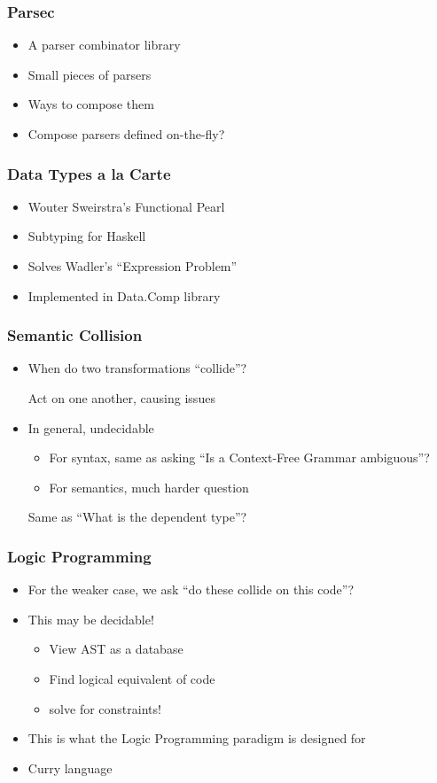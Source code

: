 \documentclass[bigger]{beamer}
\begin{document}
\begin{frame}
\frametitle{Parsec}
\label{sec-4}


\begin{itemize}
\item A parser combinator library
\item Small pieces of parsers
\item Ways to compose them
\item Compose parsers defined on-the-fly?
\end{itemize}
\end{frame}
\begin{frame}
\frametitle{Data Types a la Carte}
\label{sec-5}


\begin{itemize}
\item Wouter Sweirstra's Functional Pearl
\item Subtyping for Haskell
\item Solves Wadler's ``Expression Problem''
\item Implemented in Data.Comp library
\end{itemize}
\end{frame}
\begin{frame}
\frametitle{Semantic Collision}
\label{sec-6}


\begin{itemize}
\item When do two transformations ``collide''?

    Act on one another, causing issues
\item In general, undecidable
\begin{itemize}
\item For syntax, same as asking ``Is a Context-Free Grammar ambiguous''?
\item For semantics, much harder question
\end{itemize}
Same as ``What is the dependent type''?
\end{itemize}
\end{frame}
\begin{frame}
\frametitle{Logic Programming}
\label{sec-7}


\begin{itemize}
\item For the weaker case, we ask ``do these collide on this code''?
\item This may be decidable!
\begin{itemize}
\item View AST as a database
\item Find logical equivalent of code
\item solve for constraints!
\end{itemize}
\item This is what the Logic Programming paradigm is designed for
\item Curry language
\end{itemize}
\end{frame}
\end{document}

